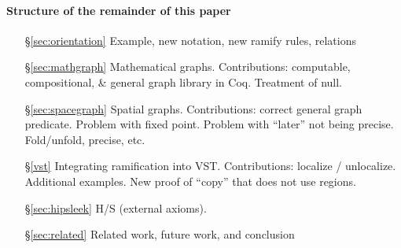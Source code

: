 \paragraph{Structure of the remainder of this paper}
\begin{itemize}
\item[\S\ref{sec:orientation}] Example, new notation, new ramify rules, relations
\item[\S\ref{sec:mathgraph}] Mathematical graphs.  Contributions: computable, compositional, \& general graph library in Coq.  Treatment of null.
\item[\S\ref{sec:spacegraph}] Spatial graphs.  Contributions: correct general graph predicate.  Problem with fixed point.  Problem with ``later'' not being precise.  Fold/unfold, precise, etc.
\item[\S\ref{vst}] Integrating ramification into VST.  Contributions: localize / unlocalize.  Additional examples.  New proof of ``copy'' that does not use regions.
\item[\S\ref{sec:hipsleek}] H/S (external axioms).
\item[\S\ref{sec:related}] Related work, future work, and conclusion
\end{itemize}
